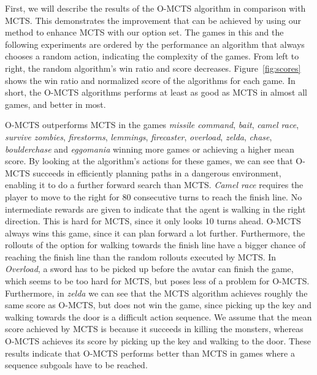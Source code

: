 First, we will describe the results of the O-MCTS algorithm in comparison with
MCTS\@.  This demonstrates the improvement that can be achieved by using our
method to enhance MCTS with our option set.  The games in this and the following
experiments are ordered by the performance an algorithm that always chooses a
random action, indicating the complexity of the games.  From left to right, the
random algorithm's win ratio and score decreases. Figure~\ref{fig:scores} shows
the win ratio and normalized score of the algorithms for each game. In short,
the O-MCTS algorithms performs at least as good as MCTS in almost all games, and
better in most.

O-MCTS outperforms MCTS in the games \textit{missile command}, \textit{bait},
\textit{camel race}, \textit{survive zombies}, \textit{firestorms},
\textit{lemmings}, \textit{firecaster}, \textit{overload}, \textit{zelda},
\textit{chase}, \textit{boulderchase} and \textit{eggomania} winning more games
or achieving a higher mean score. By looking at the algorithm's actions for
these games, we can see that O-MCTS succeeds in efficiently planning paths in a
dangerous environment, enabling it to do a further forward search than MCTS\@. 
\textit{Camel race} requires the player to
move to the right for 80 consecutive turns to reach the finish line. No
intermediate rewards are given to indicate that the agent is walking in the
right direction. This is hard for MCTS, since it only looks 10 turns ahead.
O-MCTS always wins this game, since it can plan forward a lot further.
Furthermore, the rollouts of the option for walking towards the finish line have
a bigger chance of reaching the finish line than the random rollouts executed by
MCTS\@.
In \textit{Overload}, a sword has to be picked up before the avatar can finish the
game, which seems to be too hard for MCTS, but poses less of a problem for
O-MCTS\@.  Furthermore, in \textit{zelda} we can see that the MCTS algorithm
achieves roughly the same score as O-MCTS, but does not win the game, since
picking up the key and walking towards the door is a difficult action sequence.
We assume that the mean score achieved by MCTS is because it succeeds in killing
the monsters, whereas O-MCTS achieves its score by picking up the key and
walking to the door.  These results indicate that O-MCTS performs better than
MCTS in games where a sequence subgoals have to be reached.


